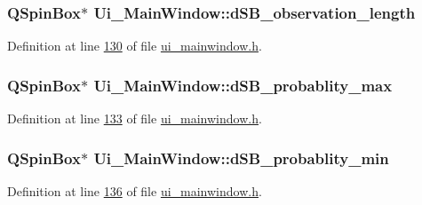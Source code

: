 \hypertarget{a00080_a1fe1bf902f2a365c4c94612d2a2ffbcc}{
\subsubsection[{d\+S\+B\+\_\+observation\+\_\+length}]{\setlength{\rightskip}{0pt plus 5cm}Q\+Spin\+Box$\ast$ Ui\+\_\+\+Main\+Window\+::d\+S\+B\+\_\+observation\+\_\+length}}\label{a00080_a1fe1bf902f2a365c4c94612d2a2ffbcc}


Definition at line \hyperlink{a00139_source_l00130}{130} of file \hyperlink{a00139_source}{ui\+\_\+mainwindow.\+h}.

\hypertarget{a00080_a137b79e810736643ac4b15e221909871}{
\subsubsection[{d\+S\+B\+\_\+probablity\+\_\+max}]{\setlength{\rightskip}{0pt plus 5cm}Q\+Spin\+Box$\ast$ Ui\+\_\+\+Main\+Window\+::d\+S\+B\+\_\+probablity\+\_\+max}}\label{a00080_a137b79e810736643ac4b15e221909871}


Definition at line \hyperlink{a00139_source_l00133}{133} of file \hyperlink{a00139_source}{ui\+\_\+mainwindow.\+h}.

\hypertarget{a00080_adfd6cf470c736f358c6982f9a635f04f}{
\subsubsection[{d\+S\+B\+\_\+probablity\+\_\+min}]{\setlength{\rightskip}{0pt plus 5cm}Q\+Spin\+Box$\ast$ Ui\+\_\+\+Main\+Window\+::d\+S\+B\+\_\+probablity\+\_\+min}}\label{a00080_adfd6cf470c736f358c6982f9a635f04f}


Definition at line \hyperlink{a00139_source_l00136}{136} of file \hyperlink{a00139_source}{ui\+\_\+mainwindow.\+h}.

